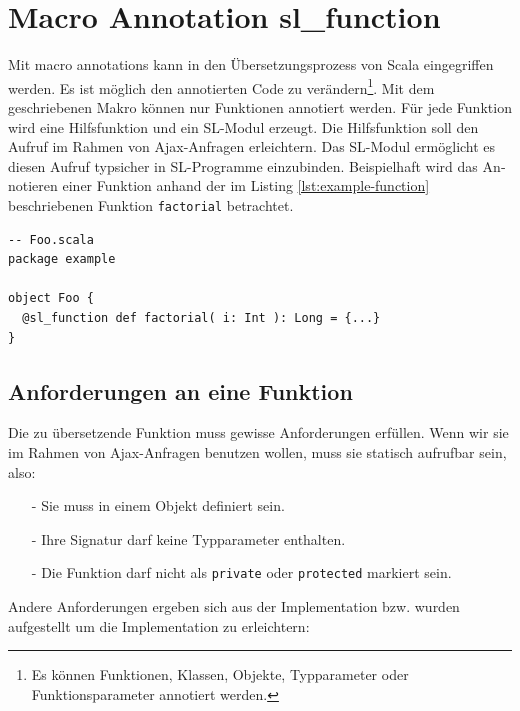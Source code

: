 \documentclass[12pt,bibtotoc]{scrreprt}
\begin{document}

\section{Macro Annotation sl\_function }
\label{sec:annotation-macro}

Mit macro annotations kann in den Übersetzungsprozess von Scala eingegriffen werden\cite{EPFL1}. Es ist möglich den annotierten Code zu verändern\footnote{Es können Funktionen, Klassen, Objekte, Typparameter oder Funktionsparameter annotiert werden.}. Mit dem geschriebenen Makro können nur Funktionen annotiert werden. Für jede Funktion wird eine Hilfsfunktion und ein \ac{SL}-Modul erzeugt. Die Hilfsfunktion soll den Aufruf im Rahmen von Ajax-Anfragen erleichtern. Das \ac{SL}-Modul ermöglicht es diesen Aufruf typsicher in \ac{SL}-Programme einzubinden. Beispielhaft wird das An­no­tie­ren einer Funktion anhand der im Listing \ref{lst:example-function} beschriebenen Funktion \lstinline!factorial! betrachtet.


\begin{lstlisting}[caption=Scala Beispielfunktion, label=lst:example-function, float=h]
-- Foo.scala
package example

object Foo {
  @sl_function def factorial( i: Int ): Long = {...}
}
\end{lstlisting}

\subsection{Anforderungen an eine Funktion}

Die zu übersetzende Funktion muss gewisse Anforderungen erfüllen. Wenn wir sie im Rahmen von Ajax-Anfragen benutzen wollen, muss sie statisch aufrufbar sein, also:
\begin{itemize}
  \item[-]{Sie muss in einem Objekt definiert sein.}
  \item[-]{Ihre Signatur darf keine Typparameter enthalten.}
  \item[-]{Die Funktion darf nicht als \lstinline!private! oder \lstinline!protected! markiert sein.}
 \end{itemize}

Andere Anforderungen ergeben sich aus der Implementation bzw. wurden aufgestellt um die Implementation zu erleichtern:
\end{document}
